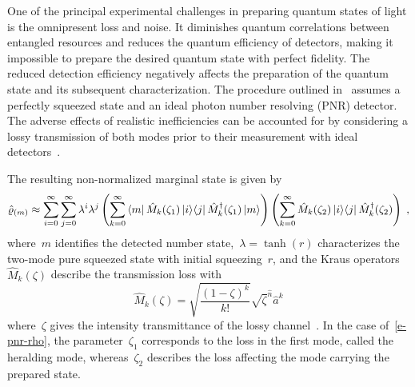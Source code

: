 \documentclass{optica-article}
\begin{document}
One of the principal experimental challenges in preparing quantum states of light is the omnipresent loss and noise. It diminishes quantum correlations between entangled resources and reduces the quantum efficiency of detectors, making it impossible to prepare the desired quantum state with perfect fidelity. The reduced detection efficiency negatively affects the preparation of the quantum state and its subsequent characterization. The procedure outlined in~ assumes a perfectly squeezed state and an ideal photon number resolving (PNR) detector. The adverse effects of realistic inefficiencies can be accounted for by considering a lossy transmission of both modes prior to their measurement with ideal detectors~\cite{feito2009}.

The resulting non-normalized marginal state is given by
%
\begin{equation}\label{e-pnr-rho}
  \hatrho_{(m)} \approx
  \sum_{i = 0}^{\infty} 
  \sum_{j = 0}^{\infty}
    \lambda^{i} \lambda^{j}
    \left(
      \sum_{k = 0}^{\infty}
        \bra{m} \hat{M}_{k} (\zeta_{1}) \ketbra{i}{j} \hat{M}_{k}^{\dagger} (\zeta_{1}) \ket{m}
    \right)
    \left(
      \sum_{k = 0}^{\infty}
        \hat{M}_{k}(\zeta_{2}) \ketbra{i}{j} \hat{M}_{k}^{\dagger} (\zeta_{2})
    \right) \Qc
\end{equation}
%
where~$m$ identifies the detected number state,~${\lambda = \tanh(r)}$ characterizes the two-mode pure squeezed state with initial squeezing~$r$, and the Kraus operators~${\hat{M}_{k} (\zeta)}$ describe the transmission loss with
%
\begin{equation}
  \hat{M}_{k} (\zeta) =
    \sqrt{ \frac{(1 - \zeta)^{k}}{k!} } 
    \sqrt{\zeta}^{\hat{n}} \hat{a}^{k}
\end{equation}
%
where~$\zeta$ gives the intensity transmittance of the lossy channel~\cite{ivan2011}. In the case of~\eqref{e-pnr-rho}, the parameter~$\zeta_{1}$ corresponds to the loss in the first mode, called the heralding mode, whereas~$\zeta_{2}$ describes the loss affecting the mode carrying the prepared state.
\end{document}
